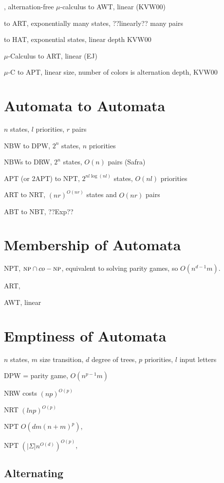 \documentclass[a4paper,10pt]{article}
\begin{document}
\CTL, alternation-free $\mu$-calculus to AWT, linear (KVW00)

\CTLS to ART, exponentially many states, ??linearly?? many pairs \cite{BVW94}

\CTLS to HAT, exponential states, linear depth KVW00

$\mu$-Calculus to ART, linear (EJ)

$\mu$-C to APT, linear size, number of colors is alternation depth, KVW00

\section{Automata to Automata}
$n$ states, $l$ priorities, $r$ pairs

NBW to  DPW, $2^n$ states, $n$ priorities \cite{Piterm06}

NBWs to DRW, $2^n$ states, $O(n)$ pairs (Safra)

APT (or 2APT) to NPT, $2^{nl\log(nl)}$ states, $O(nl)$ priorities \cite{Muller95,Vardi98}

ART to NRT, $(nr)^{O(nr)}$ states and $O(nr)$ pairs \cite{Muller95}

ABT to NBT, ??Exp?? \cite{Muller95}

\section{Membership of Automata}

NPT, $\textsc{np} \cap co-\textsc{np}$, equivalent to solving parity games, so $O(n^{d-1}m)$.

ART, \np \cite{KV}

AWT, linear \cite{KV}

\section{Emptiness of Automata}
$n$ states, $m$ size transition, $d$ degree of trees, $p$ priorities, $l$ input letters

DPW = parity game, $O(n^{p-1}m)$

NRW costs $(np)^{O(p)}$ \cite{PnueliRosner89}

NRT $(lnp)^{O(p)}$ \cite{PnueliRosner89}

NPT $O(dm(n+m)^p)$, \cite{Loding14}

NPT $(|\Sigma| n^{O(d)})^{O(p)}$, \cite{BastienThesis}

\subsection{Alternating}
\end{document}

